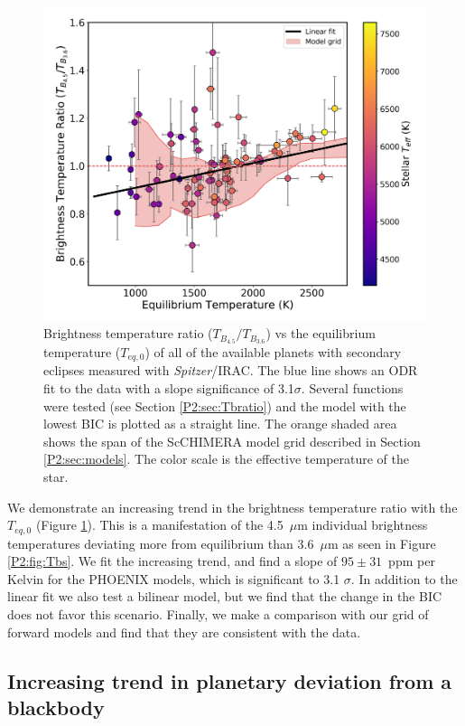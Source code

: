 \begin{figure}
    \centering
    \includegraphics[width=\linewidth]{TbratiovsTeq_wlabels.pdf}
    \caption{Brightness temperature ratio ($T_{B_{4.5}}/T_{B_{3.6}}$) vs the equilibrium temperature ($T_{eq,\textit{0}}$) of all of the available planets with secondary eclipses measured with \textit{Spitzer}/IRAC. The blue line shows an ODR fit to the data with a slope significance of 3.1$\sigma$. Several functions were tested (see Section \ref{P2:sec:Tbratio}) and  the model with the lowest BIC is plotted as  a straight line. The orange shaded area shows the span of the ScCHIMERA model grid described in Section \ref{P2:sec:models}. The color scale is the effective temperature of the star.}
    \label{P2:fig:ratios}
\end{figure}

We demonstrate an increasing trend in the brightness temperature ratio with the $T_{eq,\textit{0}}$ (Figure \ref{P2:fig:ratios}). This is a manifestation of the 4.5~$\mu$m individual brightness temperatures deviating more from equilibrium than 3.6~$\mu$m as seen in Figure \ref{P2:fig:Tbs}. We fit the increasing trend, and find a slope of $95\pm31$~ppm per Kelvin for the PHOENIX models, which is significant to 3.1 $\sigma$. In addition to the linear fit we also test a bilinear model, but we find that the change in the BIC does not favor this scenario. Finally, we make a comparison with our grid of forward models and find that they are consistent with the data.

\subsection{Increasing trend in planetary deviation from a blackbody}
\label{P2:sec:resultsdevBB}

